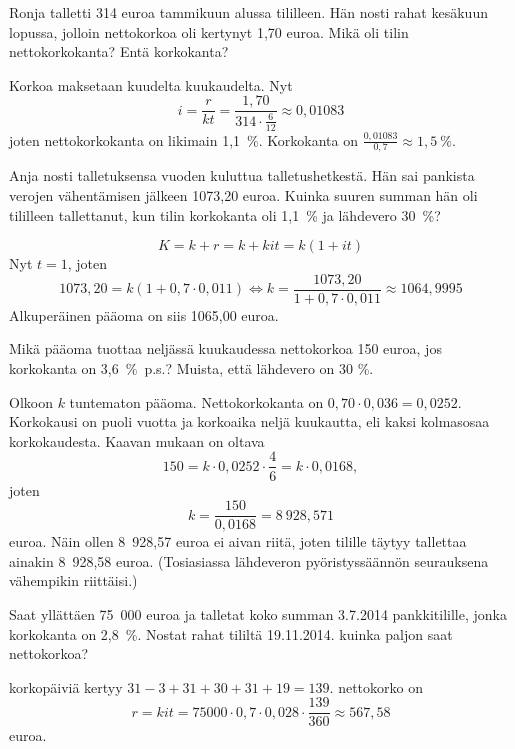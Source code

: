 \documentclass[a4paper,10pt]{article}\usepackage[]{graphicx}\usepackage[]{color}
\begin{document}
\begin{question} Ronja talletti 314 euroa tammikuun alussa tililleen. Hän nosti rahat kesäkuun lopussa, jolloin nettokorkoa oli kertynyt
 1,70 euroa. Mikä oli tilin nettokorkokanta? Entä korkokanta?
\end{question}\begin{solution}
    Korkoa maksetaan kuudelta kuukaudelta. Nyt
    \[
        i = \frac{r}{kt} = \frac{1,70}{314\cdot\frac{6}{12}}\approx 0,01083
    \]
    joten nettokorkokanta  on likimain 1,1~\%. Korkokanta on \(\frac{0,01083}{0,7}\approx 1,5~\%\).
\end{solution}

\begin{question} Anja nosti talletuksensa vuoden kuluttua talletushetkestä. Hän sai pankista verojen vähentämisen jälkeen 1073,20 euroa.
 Kuinka suuren summan hän oli tililleen tallettanut, kun tilin korkokanta oli 1,1~\% ja lähdevero 30~\%?
\end{question}
\begin{solution}
    \[
        K = k + r = k + kit = k(1+it)
    \]
    Nyt \(t = 1\), joten
    \[
        1073,20 = k(1+0,7\cdot0,011)\Leftrightarrow k = \frac{1073,20}{1+0,7\cdot0,011} \approx 1064,9995
    \]
    Alkuperäinen pääoma on siis 1065,00 euroa.
\end{solution}

\begin{question}
        Mikä pääoma tuottaa neljässä kuukaudessa nettokorkoa 150 euroa, jos korkokanta on 3{,}6~\%~p.s.? Muista, että lähdevero on 30 \%.
\end{question}
\begin{solution}
    Olkoon \(k\) tuntematon pääoma. Nettokorkokanta on \(0,70\cdot0{,}036 = 0{,}0252\).
    Korkokausi on puoli vuotta ja korkoaika neljä kuukautta, eli kaksi kolmasosaa korkokaudesta.
    Kaavan mukaan on oltava
    \[
        150 = k\cdot 0{,}0252\cdot \frac{4}{6} = k\cdot 0{,}0168,
    \]
        joten
    \[
        k = \frac{150}{0{,}0168} = 8~928{,}571
    \]
    euroa. Näin ollen 8~928{,}57 euroa ei aivan riitä, joten tilille täytyy tallettaa ainakin 8~928{,}58 euroa. (Tosiasiassa lähdeveron pyöristyssäännön seurauksena vähempikin riittäisi.)
\end{solution}

\begin{question} 
Saat yllättäen 75~000 euroa ja talletat koko summan 3.7.2014 pankkitilille, jonka korkokanta on 2{,}8~\%. Nostat rahat tililtä 19.11.2014. kuinka paljon saat nettokorkoa?
\end{question}
\begin{solution}
    korkopäiviä kertyy \(31-3+31+30+31+19 = 139\). nettokorko on
    \[
        r = kit = 75000\cdot0,7\cdot 0,028\cdot\frac{139}{360}\approx 567,58
    \]
    euroa.
\end{solution}
\end{document}
